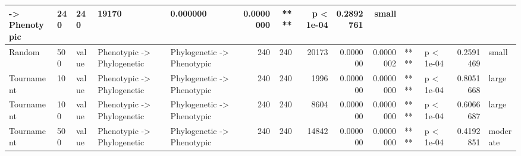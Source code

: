 \documentclass[]{book}
\begin{document}
\begin{table}
\begin{tabular}[t]{l|l|l|l|l|r|r|r|r|r|l|l|r|l}
    ->
Phenotypic & 240 & 240 & 19170 & 0.000000 & 0.0000000 & **** & p < 1e-04 & 0.2892761 & small\\
\hline
Random & 500 & value & Phenotypic
    ->
Phylogenetic & Phylogenetic
    ->
Phenotypic & 240 & 240 & 20173 & 0.000000 & 0.0000002 & **** & p < 1e-04 & 0.2591469 & small\\
\hline
Tournament & 10 & value & Phenotypic
    ->
Phylogenetic & Phylogenetic
    ->
Phenotypic & 240 & 240 & 1996 & 0.000000 & 0.0000000 & **** & p < 1e-04 & 0.8051668 & large\\
\hline
Tournament & 100 & value & Phenotypic
    ->
Phylogenetic & Phylogenetic
    ->
Phenotypic & 240 & 240 & 8604 & 0.000000 & 0.0000000 & **** & p < 1e-04 & 0.6066687 & large\\
\hline
Tournament & 500 & value & Phenotypic
    ->
Phylogenetic & Phylogenetic
    ->
Phenotypic & 240 & 240 & 14842 & 0.000000 & 0.0000000 & **** & p < 1e-04 & 0.4192851 & moderate\\
\hline
\end{tabular}
\end{table}


\end{document}
